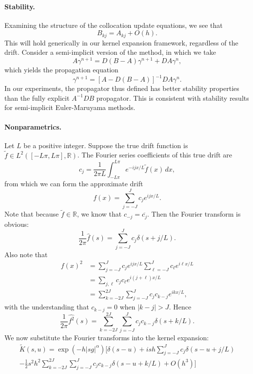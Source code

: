 \documentclass[11pt,letterpaper]{article}
\begin{document}
\paragraph{Stability.} Examining the structure of the collocation update equations, we see that
\[
B_{kj} = A_{kj} + O(h).
\]
This will hold generically in our kernel expansion framework, regardless of the drift.  Consider a semi-implicit version of the method, in which we take
\[
A \gamma^{n+1} = D (B - A) \gamma^{n+1} + D A \gamma^n,
\]
which yields the propagation equation
\[
\gamma^{n+1} = \left[ A - D(B-A) \right]^{-1} D A \gamma^n.
\]
In our experiments, the propagator thus defined has better stability properties than the fully explicit $A^{-1} D B$ propagator. This is consistent with stability results for semi-implicit Euler-Maruyama methods.

\paragraph{Nonparametrics.} Let $L$ be a positive integer. Suppose the true drift function is $\widetilde{f} \in L^2([-L\pi,L\pi],\mathbb{R})$.  The Fourier series coefficients of this true drift are
\[
c_j = \frac{1}{2 \pi L} \int_{-L\pi}^{L\pi} e^{-i j x/L} \widetilde{f}(x) \, dx,
\]
from which we can form the approximate drift
\[
f(x) = \sum_{j=-J}^J c_j e^{i j x/L}.
\]
Note that because $\tilde{f} \in \mathbb{R}$, we know that $c_{-j} = \overline{c_j}$. Then the Fourier transform is obvious:
\[
\frac{1}{2 \pi} \widehat{f}(s) = \sum_{j=-J}^J c_j \delta(s + j/L).
\]
Also note that
\begin{align*}
f(x)^2 &= \sum_{j=-J}^J c_j e^{i j x/L} \sum_{\ell=-J}^J c_{\ell} e^{i \ell x/L} \\
 &= \sum_{j,\ell} c_j c_{\ell} e^{i (j + \ell) x/L} \\
 &= \sum_{k=-2J}^{2J} \sum_{j=-J}^J c_j c_{k-j} e^{i k x/L},
\end{align*}
with the understanding that $c_{k-j} = 0$ when $|k-j| > J$.  Hence
\[
\frac{1}{2 \pi} \widehat{f^2} (s) = \sum_{k=-2J}^{2J} \sum_{j=-J}^J c_j c_{k-j}  \delta(s + k/L).
\]
We now substitute the Fourier transforms into the kernel expansion:
\begin{multline}
 \label{eqn:nonparke}
 \widetilde{K}(s,u) = \exp{\left(  -h |s g|^{\alpha} \right)} \biggl[ \delta(s-u) + i s h \sum_{j=-J}^J c_j \delta(s - u + j/L) \\ - \frac{1}{2} s^2 h^2 \sum_{k=-2J}^{2J} \sum_{j=-J}^J c_j c_{k-j}  \delta(s - u + k/L) + O(h^3) \biggr]
 \end{multline}
\end{document}
